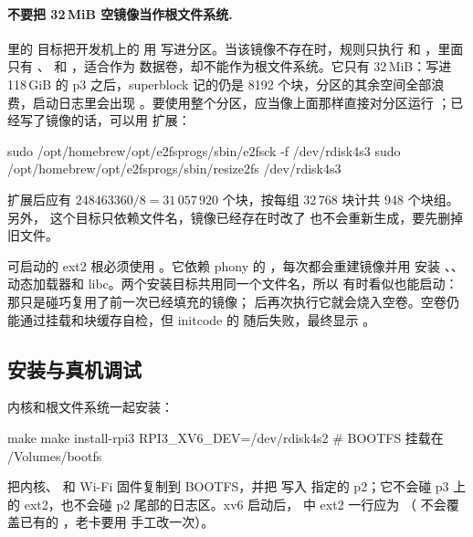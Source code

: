 \paragraph{不要把 32\,MiB 空镜像当作根文件系统.}  里的  目标把开发机上的  用  写进分区。当该镜像不存在时，规则只执行  和 ，里面只有 、 和 ，适合作为  数据卷，却不能作为根文件系统。它只有 32\,MiB：写进 118\,GiB 的 p3 之后，superblock 记的仍是 8192 个块，分区的其余空间全部浪费，启动日志里会出现 。要使用整个分区，应当像上面那样直接对分区运行 ；已经写了镜像的话，可以用  扩展：

\begin{shcode}
sudo /opt/homebrew/opt/e2fsprogs/sbin/e2fsck -f /dev/rdisk4s3
sudo /opt/homebrew/opt/e2fsprogs/sbin/resize2fs /dev/rdisk4s3
\end{shcode}

扩展后应有 $248463360 / 8 = 31\,057\,920$ 个块，按每组 32\,768 块计共 948 个块组。另外， 这个目标只依赖文件名，镜像已经存在时改了  也不会重新生成，要先删掉旧文件。

可启动的 ext2 根必须使用 。它依赖 phony 的 ，每次都会重建镜像并用  安装 、、动态加载器和 libc。两个安装目标共用同一个文件名，所以  有时看似也能启动：那只是碰巧复用了前一次已经填充的镜像； 后再次执行它就会烧入空卷。空卷仍能通过挂载和块缓存自检，但 initcode 的  随后失败，最终显示 。

\subsection{安装与真机调试}
\label{sec:ext2-install}

内核和根文件系统一起安装：

\begin{shcode}
make
make install-rpi3 RPI3_XV6_DEV=/dev/rdisk4s2   # BOOTFS 挂载在 /Volumes/bootfs
\end{shcode}

 把内核、 和 Wi-Fi 固件复制到 BOOTFS，并把  写入  指定的 p2；它不会碰 p3 上的 ext2，也不会碰 p2 尾部的日志区。xv6 启动后， 中 ext2 一行应为 （ 不会覆盖已有的 ，老卡要用  手工改一次）。

